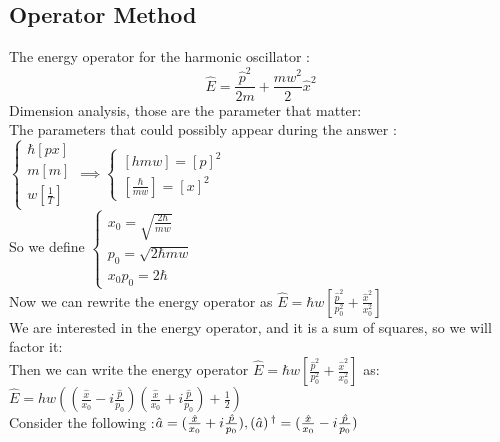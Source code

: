 \documentclass[12pt,oneside]{book}
\begin{document}
\subsection{Operator Method}
The energy operator for the harmonic oscillator :
\[ \hat{E} = \frac{\hat{p}^2}{2m}+\frac{mw^2}{2}\hat{x}^2 \]
Dimension analysis, those are the parameter that matter:\\
The parameters that could possibly appear during the answer :$\begin{cases}
		\hbar [px] \\
		m [m]      \\
		w [\frac{1}{T}]
	\end{cases}\implies \begin{cases}
		[hmw] = [p]^2 \\
		[\frac{\hbar}{mw}] = [x]^2
	\end{cases}$\\
So we define $\begin{cases}
		x_0 = \sqrt{\frac{2\hbar}{mw}} \\
		p_0 = \sqrt{2\hbar m w}        \\
		x_0p_0=2\hbar
	\end{cases}$ \\
Now we can rewrite the energy operator as $\hat{E} = \hbar w [\frac{\hat{p}^2}{p_0^2}+\frac{\hat{x}^2}{x_0^2}]$\\
We are interested in the energy operator, and it is a  sum of squares, so we will factor it:\\
Then we can write the energy operator $\hat{E} = \hbar w [\frac{\hat{p}^2}{p_0^2}+\frac{\hat{x}^2}{x_0^2}] $ as:$\hat{E}= hw((\frac{\hat{x}}{x_0}-i\frac{\hat{p}}{p_0})(\frac{\hat{x}}{x_0}+i\frac{\hat{p}}{p_0}) +\frac{1}{2})$\\
Consider the following :$\hat{a} = (\frac{\hat{x}}{x_0} + i \frac{\hat{p}}{p_0}) , (\hat{a})\operatorname{^\dagger} =(\frac{\hat{x}}{x_0} - i \frac{\hat{p}}{p_0}) $\\
\end{document}
